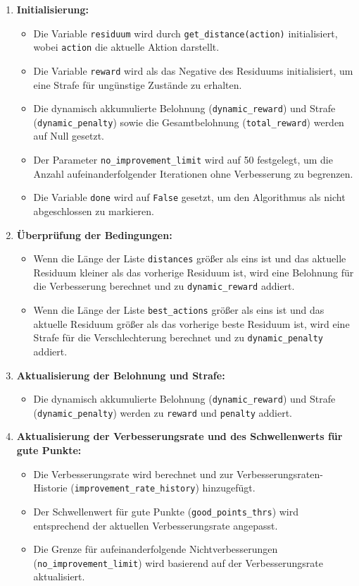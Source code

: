 \documentclass{article}
\theoremstyle{newline}
\begin{document}
\begin{onehalfspace}
\begin{enumerate}
	\item \textbf{Initialisierung:}
	\begin{itemize}
		\item Die Variable \texttt{residuum} wird durch \texttt{get\_distance(action)} initialisiert, wobei \texttt{action} die aktuelle Aktion darstellt.
		\item Die Variable \texttt{reward} wird als das Negative des Residuums initialisiert, um eine Strafe für ungünstige Zustände zu erhalten.
		\item Die dynamisch akkumulierte Belohnung (\texttt{dynamic\_reward}) und Strafe (\texttt{dynamic\_penalty}) sowie die Gesamtbelohnung (\texttt{total\_reward}) werden auf Null gesetzt.
		\item Der Parameter \texttt{no\_improvement\_limit} wird auf 50 festgelegt, um die Anzahl aufeinanderfolgender Iterationen ohne Verbesserung zu begrenzen.
		\item Die Variable \texttt{done} wird auf \texttt{False} gesetzt, um den Algorithmus als nicht abgeschlossen zu markieren.
	\end{itemize}
	
	\item \textbf{Überprüfung der Bedingungen:}
	\begin{itemize}
		\item Wenn die Länge der Liste \texttt{distances} größer als eins ist und das aktuelle Residuum kleiner als das vorherige Residuum ist, wird eine Belohnung für die Verbesserung berechnet und zu \texttt{dynamic\_reward} addiert.
		\item Wenn die Länge der Liste \texttt{best\_actions} größer als eins ist und das aktuelle Residuum größer als das vorherige beste Residuum ist, wird eine Strafe für die Verschlechterung berechnet und zu \texttt{dynamic\_penalty} addiert.
	\end{itemize}
	
	\item \textbf{Aktualisierung der Belohnung und Strafe:}
	\begin{itemize}
		\item Die dynamisch akkumulierte Belohnung (\texttt{dynamic\_reward}) und Strafe (\texttt{dynamic\_penalty}) werden zu \texttt{reward} und \texttt{penalty} addiert.
	\end{itemize}
	
	\item \textbf{Aktualisierung der Verbesserungsrate und des Schwellenwerts für gute Punkte:}
	\begin{itemize}
		\item Die Verbesserungsrate wird berechnet und zur Verbesserungsraten-Historie (\texttt{improvement\_rate\_history}) hinzugefügt.
		\item Der Schwellenwert für gute Punkte (\texttt{good\_points\_thrs}) wird entsprechend der aktuellen Verbesserungsrate angepasst.
		\item Die Grenze für aufeinanderfolgende Nichtverbesserungen (\texttt{no\_improvement\_limit}) wird basierend auf der Verbesserungsrate aktualisiert.
	\end{itemize}
	

\end{enumerate}
\end{onehalfspace}
\end{document}

